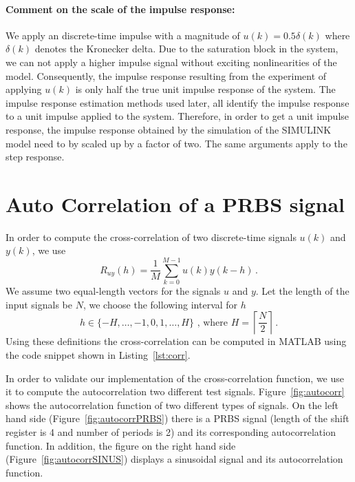\documentclass{scrartcl}
\newcommand*{\matlabcode}[3]{\begin{figure}[h!]\end{figure}}
\begin{document}
\paragraph{Comment on the scale of the impulse response: }
We apply an discrete-time impulse with a magnitude of $u(k) = 0.5\delta(k)$ where $\delta(k)$ denotes the Kronecker delta.
Due to the saturation block in the system, we can not apply a higher impulse signal without exciting nonlinearities of the model.
Consequently, the impulse response resulting from the experiment of applying $u(k)$ is only half the true unit impulse response of the system.
The impulse response estimation methods used later, all identify the impulse response to a unit impulse applied to the system.
Therefore, in order to get a unit impulse response, the impulse response obtained by the simulation of the SIMULINK model need to by scaled up by a factor of two.
The same arguments apply to the step response.

\newpage
\section{Auto Correlation of a PRBS signal}
In order to compute the cross-correlation of two discrete-time signals $u(k)$ and $y(k)$, we use 
\begin{equation}
	R_{uy}(h) = \frac{1}{M} \sum\limits_{k=0}^{M-1} u(k)y(k-h)\, .
\end{equation}
We assume two equal-length vectors for the signals $u$ and $y$. Let the length of the input signals be $N$, we choose the following interval for $h$
\begin{equation}
	h \in \{-H, \dots, -1, 0, 1, \dots, H\}\text{ , where } H = \left\lceil \frac{N}{2} \right\rceil \, .
\end{equation}
Using these definitions the cross-correlation can be computed in MATLAB using the code snippet shown in Listing~\ref{lst:corr}.

\matlabcode{../matlab/ce1/intcor.m}{Computing a discrete-time cross correlation of the signal u and y in MATLAB}{lst:corr}

In order to validate our implementation of the cross-correlation function, we use it to compute the autocorrelation two different test signals. 
Figure~\ref{fig:autocorr} shows the autocorrelation function of two different types of signals. 
On the left hand side (Figure~\ref{fig:autocorrPRBS}) there is a PRBS signal (length of the shift register is 4 and number of periods is 2) and its corresponding autocorrelation function. 
In addition, the figure on the right hand side (Figure~\ref{fig:autocorrSINUS}) displays a sinusoidal signal and its autocorrelation function.  
\end{document}
